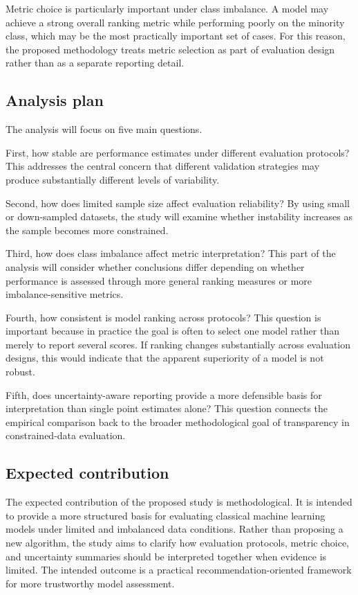 \documentclass[11pt,a4paper]{article}
\begin{document}
Metric choice is particularly important under class imbalance. A model may achieve a strong overall ranking metric while performing poorly on the minority class, which may be the most practically important set of cases. For this reason, the proposed methodology treats metric selection as part of evaluation design rather than as a separate reporting detail.

\subsection{Analysis plan}

The analysis will focus on five main questions.

First, how stable are performance estimates under different evaluation protocols? This addresses the central concern that different validation strategies may produce substantially different levels of variability.

Second, how does limited sample size affect evaluation reliability? By using small or down-sampled datasets, the study will examine whether instability increases as the sample becomes more constrained.

Third, how does class imbalance affect metric interpretation? This part of the analysis will consider whether conclusions differ depending on whether performance is assessed through more general ranking measures or more imbalance-sensitive metrics.

Fourth, how consistent is model ranking across protocols? This question is important because in practice the goal is often to select one model rather than merely to report several scores. If ranking changes substantially across evaluation designs, this would indicate that the apparent superiority of a model is not robust.

Fifth, does uncertainty-aware reporting provide a more defensible basis for interpretation than single point estimates alone? This question connects the empirical comparison back to the broader methodological goal of transparency in constrained-data evaluation.

\subsection{Expected contribution}

The expected contribution of the proposed study is methodological. It is intended to provide a more structured basis for evaluating classical machine learning models under limited and imbalanced data conditions. Rather than proposing a new algorithm, the study aims to clarify how evaluation protocols, metric choice, and uncertainty summaries should be interpreted together when evidence is limited. The intended outcome is a practical recommendation-oriented framework for more trustworthy model assessment.
\end{document}
